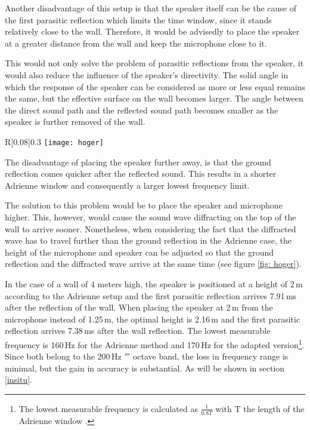 Another disadvantage of this setup is that the speaker itself can be the cause of the first parasitic reflection which limits the time window, since it stands relatively close to the wall. Therefore, it would be advisedly to place the speaker at a greater distance from the wall and keep the microphone close to it.

This would not only solve the problem of parasitic reflections from the speaker, it would also reduce the influence of the speaker's directivity. The solid angle in which the response of the speaker can be considered as more or less equal remains the same, but the effective surface on the wall becomes larger. The angle between the direct sound path and the reflected sound path becomes smaller as the speaker is further removed of the wall.

\begin{wrapfigure}{R}[0.08\textwidth]{0.3\textwidth}
  \centering
    \texttt{[image: hoger]}
  \caption{Paths of the ground reflection and top diffraction.}
  \label{fig: hoger}
  \vspace{-20pt}
\end{wrapfigure}

The disadvantage of placing the speaker further away, is that the ground reflection comes quicker after the reflected sound. This results in a shorter Adrienne window and consequently a larger lowest frequency limit.

The solution to this problem would be to place the speaker and microphone higher. This, however, would cause the sound wave diffracting on the top of the wall to arrive sooner. Nonetheless, when considering the fact that the diffracted wave has to travel further than the ground reflection in the Adrienne case, the height of the microphone and speaker can be adjusted so that the ground reflection and the diffracted wave arrive at the same time (see figure \ref{fig: hoger}).

In the case of a wall of 4 meters high, the speaker is positioned at a height of 2\,m according to the Adrienne setup and the first parasitic reflection arrives 7.91\,ms after the reflection of the wall. When placing the speaker at 2\,m from the microphone instead of 1.25\,m, the optimal height is 2.16\,m and the first parasitic reflection arrives 7.38\,ms after the wall reflection. The lowest measurable frequency is 160\,Hz for the Adrienne method and 170\,Hz for the adapted version\footnote{The lowest measurable frequency is calculated as $\frac{1}{0.8 T}$ with T the length of the Adrienne window \cite[p.70]{Geetere}.}. Since both belong to the 200\,Hz $\third$ octave band, the loss in frequency range is minimal, but the gain in accuracy is substantial. As will be shown in section \ref{insitu}.




